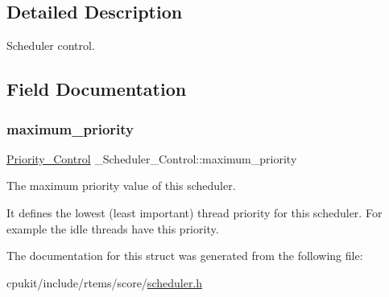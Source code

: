 \subsection{Detailed Description}
Scheduler control. 

\subsection{Field Documentation}
\mbox{\label{struct__Scheduler__Control_af40aafce4ff32694f7224d76b61628e1}} 
\subsubsection{\texorpdfstring{maximum\_priority}{maximum\_priority}}
{\footnotesize\ttfamily \mbox{\hyperlink{group__RTEMSScorePriority_ga59d02b58072d31a9a1cfe644557aefe2}{Priority\+\_\+\+Control}} \+\_\+\+Scheduler\+\_\+\+Control\+::maximum\+\_\+priority}



The maximum priority value of this scheduler. 

It defines the lowest (least important) thread priority for this scheduler. For example the idle threads have this priority. 

The documentation for this struct was generated from the following file\+:\begin{DoxyCompactItemize}
\item 
cpukit/include/rtems/score/\mbox{\hyperlink{score_2scheduler_8h}{scheduler.\+h}}\end{DoxyCompactItemize}
